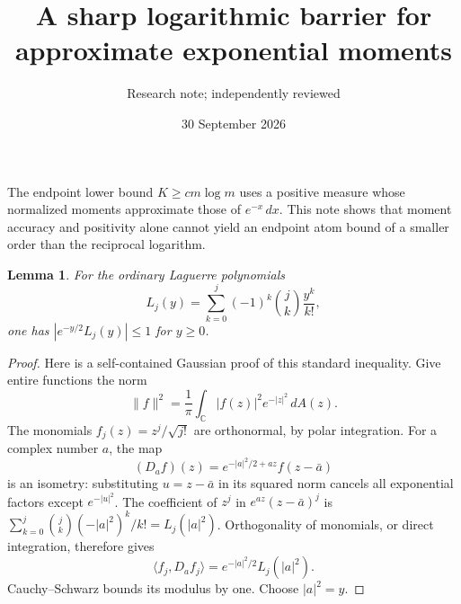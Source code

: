 \documentclass[11pt]{article}
\title{A sharp logarithmic barrier for approximate exponential moments}
\author{Research note; independently reviewed}
\date{30 September 2026}
\newtheorem{lemma}{Lemma}
\begin{document}
\maketitle
The endpoint lower bound $K\ge c m\log m$ uses a positive measure whose
normalized moments approximate those of $e^{-x}\,dx$. This note shows
that moment accuracy and positivity alone cannot yield an endpoint
atom bound of a smaller order than the reciprocal logarithm.

\begin{lemma}\label{lagbound}
For the ordinary Laguerre polynomials
\[
 L_j(y)=\sum_{k=0}^j(-1)^k\binom jk\frac{y^k}{k!},
\]
one has $|e^{-y/2}L_j(y)|\le1$ for $y\ge0$.
\end{lemma}
\begin{proof}
Here is a self-contained Gaussian proof of this standard inequality.
Give entire functions the norm
\[
 \|f\|^2=\frac1\pi\int_{\mathbb C}|f(z)|^2e^{-|z|^2}\,dA(z).
\]
The monomials $f_j(z)=z^j/\sqrt{j!}$ are orthonormal, by polar
integration. For a complex number $a$, the map
\[
 (D_af)(z)=e^{-|a|^2/2+az}f(z-\bar a)
\]
is an isometry: substituting $u=z-\bar a$ in its squared norm cancels
all exponential factors except $e^{-|u|^2}$.
The coefficient of $z^j$ in $e^{az}(z-\bar a)^j$ is
$\sum_{k=0}^j\binom jk(-|a|^2)^k/k!=L_j(|a|^2)$.
Orthogonality of monomials, or direct integration, therefore gives
\[
 \langle f_j,D_af_j\rangle=e^{-|a|^2/2}L_j(|a|^2).
\]
Cauchy--Schwarz bounds its modulus by one. Choose $|a|^2=y$.
\end{proof}
\end{document}
